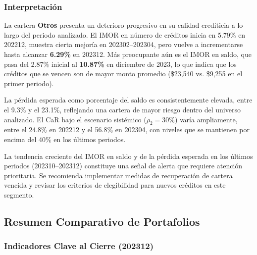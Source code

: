 \subsubsection{Interpretación}

La cartera \textbf{Otros} presenta un deterioro progresivo en su calidad crediticia a lo largo del periodo analizado. El IMOR en número de créditos inicia en 5.79\% en 202212, muestra cierta mejoría en 202302--202304, pero vuelve a incrementarse hasta alcanzar \textbf{6.29\%} en 202312. Más preocupante aún es el IMOR en saldo, que pasa del 2.87\% inicial al \textbf{10.87\%} en diciembre de 2023, lo que indica que los créditos que se vencen son de mayor monto promedio (\$23,540 vs. \$9,255 en el primer periodo).

La pérdida esperada como porcentaje del saldo es consistentemente elevada, entre el 9.3\% y el 23.1\%, reflejando una cartera de mayor riesgo dentro del universo analizado. El CaR bajo el escenario sistémico ($\rho_2 = 30\%$) varía ampliamente, entre el 24.8\% en 202212 y el 56.8\% en 202304, con niveles que se mantienen por encima del 40\% en los últimos periodos.

La tendencia creciente del IMOR en saldo y de la pérdida esperada en los últimos periodos (202310--202312) constituye una señal de alerta que requiere atención prioritaria. Se recomienda implementar medidas de recuperación de cartera vencida y revisar los criterios de elegibilidad para nuevos créditos en este segmento.

\newpage

\subsection{Resumen Comparativo de Portafolios}

\subsubsection{Indicadores Clave al Cierre (202312)}

